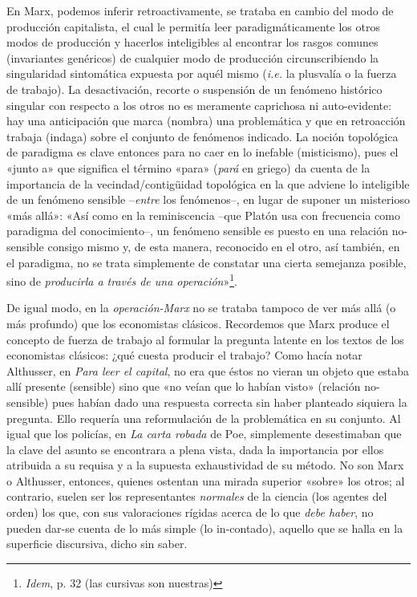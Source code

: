 En Marx, podemos inferir retroactivamente, se trataba en cambio del modo de producción capitalista, el cual le permitía leer paradigmáticamente los otros modos de producción y hacerlos inteligibles al encontrar los rasgos comunes (invariantes genéricos) de cualquier modo de producción circunscribiendo la singularidad sintomática expuesta por aquél mismo (\emph{i.e.} la plusvalía o la fuerza de trabajo). La desactivación, recorte o suspensión de un fenómeno histórico singular con respecto a los otros no es meramente caprichosa ni auto-evidente: hay una anticipación que marca (nombra) una problemática y que en retroacción trabaja (indaga) sobre el conjunto de fenómenos indicado. La noción topológica de paradigma es clave entonces para no caer en lo inefable (misticismo), pues el «junto a» que significa el término «para» (\emph{pará} en griego) da cuenta de la importancia de la vecindad/contigüidad topológica en la que adviene lo inteligible de un fenómeno sensible --\emph{entre} los fenómenos--, en lugar de suponer un misterioso «más allá»: «Así como en la reminiscencia --que Platón usa con frecuencia como paradigma del conocimiento--, un fenómeno sensible es puesto en una relación no-sensible consigo mismo y, de esta manera, reconocido en el otro, así también, en el paradigma, no se trata simplemente de constatar una cierta semejanza posible, sino de \emph{producirla a través de una operación}»\footnote{\emph{Idem}, p. 32 (las cursivas son nuestras)}.

De igual modo, en la \emph{operación-Marx} no se trataba tampoco de ver más allá (o más profundo) que los economistas clásicos. Recordemos que Marx produce el concepto de fuerza de trabajo al formular la pregunta latente en los textos de los economistas clásicos: ¿qué cuesta producir el trabajo? Como hacía notar Althusser, en \emph{Para leer el capital}, no era que éstos no vieran un objeto que estaba allí presente (sensible) sino que «no veían que lo habían visto» (relación no-sensible) pues habían dado una respuesta correcta sin haber planteado siquiera la pregunta. Ello requería una reformulación de la problemática en su conjunto. Al igual que los policías, en \emph{La carta robada} de Poe, simplemente desestimaban que la clave del asunto se encontrara a plena vista, dada la importancia por ellos atribuida a su requisa y a la supuesta exhaustividad de su método. No son Marx o Althusser, entonces, quienes ostentan una mirada superior «sobre» los otros; al contrario, suelen ser los representantes \emph{normales} de la ciencia (los agentes del orden) los que, con sus valoraciones rígidas acerca de lo que \emph{debe haber}, no pueden dar-se cuenta de lo más simple (lo in-contado), aquello que se halla en la superficie discursiva, dicho sin saber.

